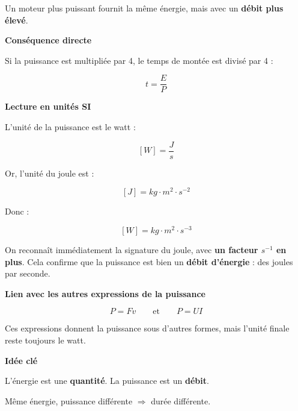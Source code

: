 \documentclass[11pt,a4paper]{article}
\begin{document}
{Un moteur plus puissant fournit la même énergie,
mais avec un \textbf{débit plus élevé}.

\vspace{0.3cm}

\textbf{Conséquence directe}

\vspace{0.1cm}

Si la puissance est multipliée par 4,  
le temps de montée est divisé par 4 :

\[
t = \frac{E}{P}
\]

\vspace{0.3cm}

\textbf{Lecture en unités SI}

\vspace{0.1cm}

L’unité de la puissance est le watt :

\[
[W] = \frac{J}{s}
\]

Or, l’unité du joule est :

\[
[J] = kg \cdot m^2 \cdot s^{-2}
\]

Donc :

\[
[W] = kg \cdot m^2 \cdot s^{-3}
\]

\vspace{0.2cm}

On reconnaît immédiatement la signature du joule,
avec \textbf{un facteur $s^{-1}$ en plus}.
Cela confirme que la puissance est bien un \textbf{débit d’énergie} :
des joules par seconde.

\vspace{0.3cm}

\textbf{Lien avec les autres expressions de la puissance}

\vspace{0.1cm}

\[
P = F v
\qquad\text{et}\qquad
P = U I
\]

Ces expressions donnent la puissance sous d’autres formes,
mais l’unité finale reste toujours le watt.

\vspace{0.3cm}

\textbf{Idée clé}

\vspace{0.1cm}

L’énergie est une \textbf{quantité}.  
La puissance est un \textbf{débit}.

Même énergie, puissance différente $\Rightarrow$ durée différente.

}
\end{document}
